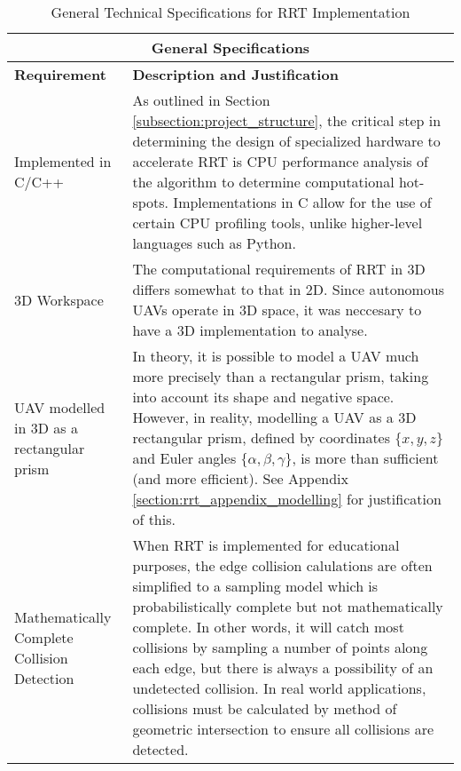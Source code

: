 
\begin{table}[H]
\begin{center}
\begin{tabular}{|p{.2\linewidth}|p{.74\linewidth}|}
    \hline
    \multicolumn{2}{|c|}{\textbf{General Specifications}} \\
    \hline
    \textbf{Requirement}             & \textbf{Description and Justification} \\
    \hline
    Implemented in C/C++    & 
        As outlined in Section \ref{subsection:project_structure}, the critical step in determining the design of specialized hardware to accelerate \gls{RRT} is CPU performance analysis of the algorithm to determine computational hot-spots. Implementations in C allow for the use of certain CPU profiling tools, unlike higher-level languages such as Python. \\
    \hline
    3D Workspace            & 
        The computational requirements of \gls{RRT} in \gls{3D} differs somewhat to that in \gls{2D}. Since autonomous \glspl{UAV} operate in 3D space, it was neccesary to have a \gls{3D} implementation to analyse. \\
    \hline
    \Gls{UAV} modelled in \gls{3D} as a rectangular prism  & 
        In theory, it is possible to model a \gls{UAV} much more precisely than a rectangular prism, taking into account its shape and negative space. However, in reality, modelling a \gls{UAV} as a \gls{3D} rectangular prism, defined by coordinates $\{x, y, z\}$ and Euler angles $\{\alpha, \beta, \gamma \}$, is more than sufficient (and more efficient). See Appendix \ref{section:rrt_appendix_modelling} for justification of this. \\
    \hline
    Mathematically Complete Collision Detection & 
        When \gls{RRT} is implemented for educational purposes, the edge collision calulations are often simplified to a sampling model which is \gls{probabilistically complete} but not \gls{mathematically complete}. In other words, it will catch most collisions by sampling a number of points along each edge, but there is always a possibility of an undetected collision. In real world applications, collisions must be calculated by method of geometric intersection to ensure all collisions are detected. \\
    \hline
\end{tabular}
\caption{General Technical Specifications for \gls{RRT} Implementation}
\label{table:RRT_Tech_Specs_General}
\end{center}
\end{table}

